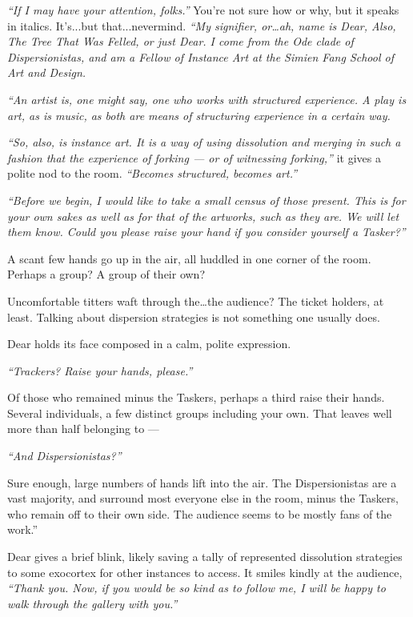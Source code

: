 \null
\vfill

\newpage

\noindent \emph{``If I may have your attention, folks.''} You're not sure how or why, but it speaks in italics. It's...but that...nevermind. \emph{``My signifier, or\ldots{}ah, name is Dear, Also, The Tree That Was Felled, or just Dear. I come from the Ode clade of Dispersionistas, and am a Fellow of Instance Art at the Simien Fang School of Art and Design.}

\emph{``An artist is, one might say, one who works with structured experience. A play is art, as is music, as both are means of structuring experience in a certain way.}

\emph{``So, also, is instance art. It is a way of using dissolution and merging in such a fashion that the experience of forking --- or of witnessing forking,''} it gives a polite nod to the room. \emph{``Becomes structured, becomes art.''}

\emph{``Before we begin, I would like to take a small census of those present. This is for your own sakes as well as for that of the artworks, such as they are. We will let them know. Could you please raise your hand if you consider yourself a Tasker?''}

A scant few hands go up in the air, all huddled in one corner of the room. Perhaps a group? A group of their own?

Uncomfortable titters waft through the\ldots{}the audience? The ticket holders, at least. Talking about dispersion strategies is not something one usually does.

Dear holds its face composed in a calm, polite expression.

\emph{``Trackers? Raise your hands, please.''}

Of those who remained minus the Taskers, perhaps a third raise their hands. Several individuals, a few distinct groups including your own. That leaves well more than half belonging to ---

\emph{``And Dispersionistas?''}

Sure enough, large numbers of hands lift into the air. The Dispersionistas are a vast majority, and surround most everyone else in the room, minus the Taskers, who remain off to their own side. The audience seems to be mostly fans of the work.''

Dear gives a brief blink, likely saving a tally of represented dissolution strategies to some exocortex for other instances to access. It smiles kindly at the audience, \emph{``Thank you. Now, if you would be so kind as to follow me, I will be happy to walk through the gallery with you.''}


